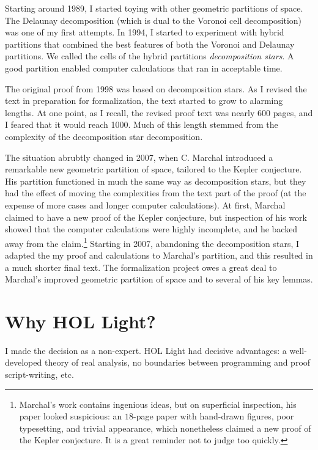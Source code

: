 \documentclass{amsart}
\begin{document}
Starting around 1989, I started toying with other geometric partitions
of space.  The Delaunay decomposition (which is dual to the Voronoi
cell decomposition) was one of my first attempts.  In 1994, I started
to experiment with hybrid partitions that combined the best features
of both the Voronoi and Delaunay partitions.  We called the cells of
the hybrid partitions \emph{decomposition stars}.  A good partition
enabled computer calculations that ran in acceptable time.

The original proof from 1998 was based on decomposition stars.  As I
revised the text in preparation for formalization, 
the text started to grow to alarming lengths.  At one point, as I 
recall, the revised proof text was nearly 600 pages, and I feared that it would
reach 1000.  Much of this length stemmed from the complexity of
the decomposition star decomposition.  

The situation abrubtly changed in 2007, when C. Marchal introduced a
remarkable new geometric partition of space, tailored to the Kepler
conjecture.  His partition functioned in much the same way as
decomposition stars, but they had the effect of moving the
complexities from the text part of the proof (at the expense of more
cases and longer computer calculations).  At first, Marchal claimed to
have a new proof of the Kepler conjecture, but inspection of his work
showed that the computer calculations were highly incomplete, and he
backed away from the claim.\footnote{Marchal's work contains ingenious
  ideas, but on superficial inspection, his paper looked suspicious:
  an $18$-page paper with hand-drawn figures, poor typesetting, and
  trivial appearance, which nonetheless claimed a new proof of the
  Kepler conjecture. It is a great reminder not to judge too quickly.}
Starting in 2007, abandoning the decomposition stars, I adapted the my
proof and calculations to Marchal's partition, and this resulted in a
much shorter final text.  The formalization project owes a great deal
to Marchal's improved geometric partition of space and to several of
his key lemmas.




\section{Why HOL Light?}

I made the decision as a non-expert.  HOL Light had decisive
advantages: a well-developed theory of real analysis, no boundaries
between programming and proof script-writing, etc.
\end{document}
